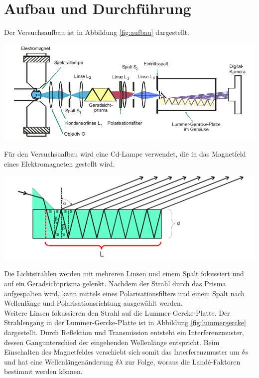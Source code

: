 \documentclass[captions=tableheading]{scrartcl}
\begin{document}
\section{Aufbau und Durchführung}
Der Versuchsaufbau ist in Abbildung \ref{fig:aufbau} dargestellt. 
\begin{center}
	\includegraphics[width=\textwidth]{images/aufbau.png}
	\label{fig:aufbau}
\end{center}
Für den Versuchsuafbau wird eine Cd-Lampe verwendet, die in das Magnetfeld eines Elektromagneten gestellt wird. 
\begin{center}
	\includegraphics[width=\textwidth]{images/lummergercke.png}
	\label{fig:lummergercke}
\end{center}
Die Lichtstrahlen werden mit mehreren Linsen und einem Spalt fokussiert und auf ein Geradsichtprisma gelenkt. Nachdem der Strahl durch das Prisma aufgespalten wird, kann mittels eines Polarisationsfilters und einem Spalt nach Wellenlänge und Polarisationsrichtung ausgewählt werden. \\
Weitere Linsen fokussieren den Strahl auf die Lummer-Gercke-Platte. Der Strahlengang in der Lummer-Gercke-Platte ist in Abbildung \ref{fig:lummergercke} dargestellt.
Durch Reflektion und Transmission entsteht ein Interferenzmuster, dessen Gangunterschied der eingehenden Wellenlänge entspricht. Beim Einschalten des Magnetfeldes verschiebt sich somit das Interferenzmuster um $\delta s$ und hat eine Wellenlängenänderung $\delta \lambda$ zur Folge, woraus die Landé-Faktoren bestimmt werden können. \\
\end{document}
